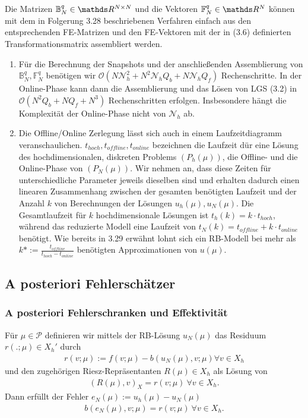 Die Matrizen $\mathbb{B}_N^q\in \R^{N\times N}$ und die Vektoren $\mathbb{F}_N^q\in \R^N$ können mit dem in Folgerung 3.28 beschriebenen Verfahren einfach aus den entsprechenden FE-Matrizen und den FE-Vektoren mit der in (3.6) definierten Transformationsmatrix assembliert werden.

\begin{enumerate}[(1)]
	\item Für die Berechnung der Snapshots und der anschließenden Assemblierung von $\mathbb{B}_N^q,\mathbb{F}_N^q$ benötigen wir $\mathcal{O}(N\mathcal{N}_h^2 + N^2\mathcal{N}_hQ_b + N\mathcal{N}_hQ_f)$ Rechenschritte.
	In der Online-Phase kann dann die Assemblierung und das Lösen von LGS (3.2) in $\mathcal{O}(N^2Q_b + NQ_f + N^3)$ Rechenschritten erfolgen.
	Insbesondere hängt die Komplexität der Online-Phase nicht von $\mathcal{N}_h$ ab.
	\item Die Offline/Online Zerlegung lässt sich auch in einem Laufzeitdiagramm veranschaulichen. $t_{hoch},t_{offline},t_{online}$ bezeichnen die Laufzeit dür eine Lösung des hochdimensionalen, diskreten Problems $(P_h(\mu))$, die Offline- und die Online-Phase von $(P_N(\mu))$.
	Wir nehmen an, dass diese Zeiten für unterschiedliche Parameter jeweils dieselben sind und erhalten dadurch einen linearen Zusammenhang zwischen der gesamten benötigten Laufzeit und der Anzahl $k$ von Berechnungen der Lösungen $u_h(\mu),u_N(\mu)$.
	Die Gesamtlaufzeit für $k$ hochdimensionale Lösungen ist $t_h(k) = k\cdot t_{hoch}$, während das reduzierte Modell eine Laufzeit von $t_N(k) = t_{offline} + k\cdot t_{online}$ benötigt.
	Wie bereits in 3.29 erwähnt lohnt sich ein RB-Modell bei mehr als $k* := \frac{t_{offline}}{t_{hoch}-t_{online}}$ benötigten Approximationen von $u(\mu)$.
\end{enumerate}

\subsection{A posteriori Fehlerschätzer}

\subsubsection{A posteriori Fehlerschranken und Effektivität}

Für $\mu \in \mathcal{P}$ definieren wir mittels der RB-Lösung $u_N(\mu)$ das Residuum $r(.;\mu)\in X_h'$ durch
\begin{align}
r(v;\mu) := f(v;\mu)- b(u_N(\mu),v;\mu) \forall v\in X_h
\end{align}
und den zugehörigen Riesz-Repräsentanten $R(\mu)\in X_h$ als Lösung von
\begin{align}
(R(\mu),v)_X = r(v;\mu) ~\forall v\in X_h.
\end{align}
Dann erfüllt der Fehler $e_N(\mu) := u_h(\mu)-u_N(\mu)$
\begin{align}
b(e_N(\mu),v;\mu) = r(v;\mu) ~\forall v\in X_h.
\end{align}

